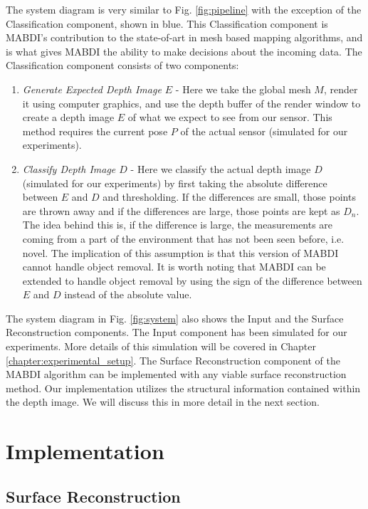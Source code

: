 The system diagram is very similar to Fig. \ref{fig:pipeline} with the exception
of the Classification component, shown in blue. This Classification component is
MABDI's contribution to the state-of-art in mesh based mapping algorithms, and
is what gives MABDI the ability to make decisions about the incoming data. The
Classification component consists of two components:
\begin{enumerate}
    \item \textit{Generate Expected Depth Image $E$} - Here we take the global
    mesh $M$, render it using computer graphics, and use the depth buffer of the
    render window to create a depth image $E$ of what we expect to see from our
    sensor. This method requires the current pose $P$ of the actual sensor
    (simulated for our experiments).
    \item \textit{Classify Depth Image $D$} - Here we classify the actual depth
    image $D$ (simulated for our experiments) by first taking the absolute
    difference between $E$ and $D$ and thresholding. If the differences are
    small, those points are thrown away and if the differences are large, those
    points are kept as $D_n$. The idea behind this is, if the difference is
    large, the measurements are coming from a part of the environment that has
    not been seen before, i.e. novel. The implication of this assumption is that
    this version of MABDI cannot handle object removal. It is worth noting
    that MABDI can be extended to handle object removal by using the sign of the
    difference between $E$ and $D$ instead of the absolute value.
\end{enumerate}

The system diagram in Fig. \ref{fig:system} also shows the Input and the Surface
Reconstruction components. The Input component has been simulated for our
experiments. More details of this simulation will be covered in Chapter
\ref{chapter:experimental_setup}. The Surface Reconstruction component of the
MABDI algorithm can be implemented with any viable surface reconstruction
method. Our implementation utilizes the structural information contained within
the depth image. We will discuss this in more detail in the next section.

\section{Implementation}

\subsection{Surface Reconstruction}
\label{subsection:surface_reconstruction}

